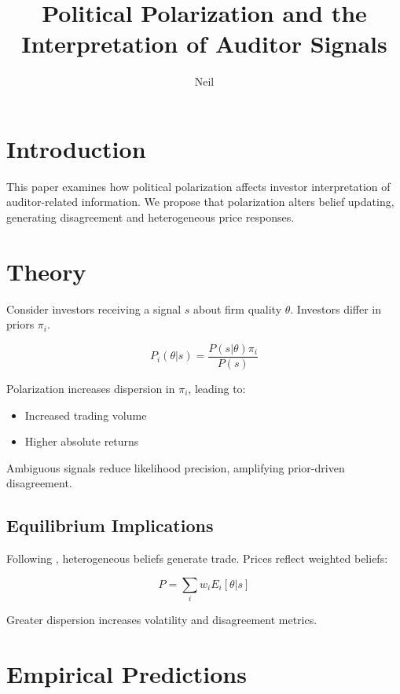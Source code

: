 \documentclass[12pt]{article}
\title{Political Polarization and the Interpretation of Auditor Signals}
\author{Neil}
\date{}
\begin{document}
\maketitle
\onehalfspacing

\section{Introduction}
This paper examines how political polarization affects investor interpretation of auditor-related information. We propose that polarization alters belief updating, generating disagreement and heterogeneous price responses.

\section{Theory}

Consider investors receiving a signal $s$ about firm quality $\theta$. Investors differ in priors $\pi_i$.

\begin{equation}
P_i(\theta|s) = \frac{P(s|\theta)\pi_i}{P(s)}
\end{equation}

Polarization increases dispersion in $\pi_i$, leading to:

\begin{itemize}
\item Increased trading volume
\item Higher absolute returns
\end{itemize}

Ambiguous signals reduce likelihood precision, amplifying prior-driven disagreement.

\subsection{Equilibrium Implications}

Following \citet{harris1993}, heterogeneous beliefs generate trade. Prices reflect weighted beliefs:

\begin{equation}
P = \sum_i w_i E_i[\theta|s]
\end{equation}

Greater dispersion increases volatility and disagreement metrics.

\section{Empirical Predictions}
\end{document}

